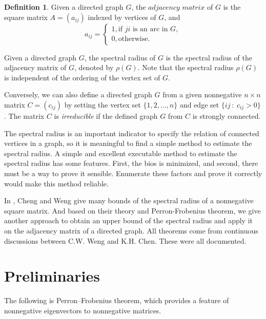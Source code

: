 \documentclass[12pt, a4paper]{article}
\theoremstyle{plain}
\theoremstyle{definition}
\newtheorem{defn}[thm]{Definition}
\begin{document}
\begin{defn}
    Given a directed graph $G$, the $\textit{adjacency matrix}$ of $G$ is the square
    matrix $A = (a_{ij})$ indexed by vertices of $G$, and
     \[a_{ij} =\begin{cases}
        1, \text{if $ji$ is an arc in $G$}, \\
        0, \text{otherwise.}
            \end{cases}
     \]
\end{defn}


Given a directed graph $G$, the spectral radius of $G$ is the
 spectral radius of the adjacency matrix of $G$, denoted by
 $\rho(G)$. Note that the spectral radius $\rho(G)$ is
 independent of the ordering of the vertex set of $G$. 



Conversely, we can also define a directed graph $G$ from a given
 nonnegative $n\times n$ matrix $C=(c_{ij})$  by setting the vertex
 set $\{1, 2, \ldots, n\}$ and edge set $\{ij~\colon~c_{ij}>0\}$.
 The matrix $C$ is {\it irreducible} if the defined graph $G$ from
 $C$ is strongly connected.  


The spectral radius is an important indicator to specify the relation
 of connected vertices in a graph, so it is meaningful to find a simple
 method to estimate the spectral radius. A simple and excellent
 executable method to estimate the spectral radius has some features.
 First, the bios is minimized, and second, there must be a way to prove
 it sensible. Enumerate these factors and prove it correctly would make this method reliable.

In \cite{chang}, Cheng and Weng give many bounds of the spectral radius of a nonnegative square matrix. And based on their theory and Perron-Frobenius theorem, we give another approach to obtain an upper bound of the spectral radius and apply it on the adjacency matrix of a directed graph.
All theorems come from continuous discussions between C.W. Weng and K.H. Chen. These were all documented\cite{src_files}.


\section{Preliminaries}

The following is Perron–Frobenius theorem, which provides a feature of
 nonnegative eigenvectors to nonnegative matrices.
\end{document}
